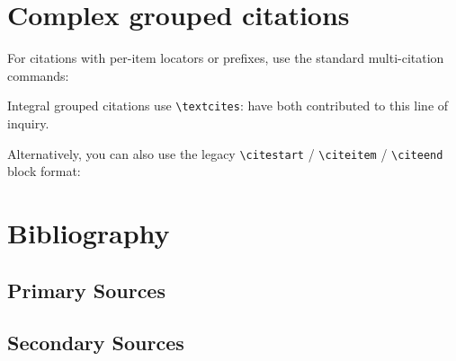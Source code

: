 \documentclass{article}
\begin{document}
\section{Complex grouped citations}

For citations with per-item locators or prefixes, use the standard multi-citation
commands: \cites[see]{chen2017}[also]{okafor2024}

Integral grouped citations use \verb|\textcites|: \textcites{chen2017}{chen2020} have both contributed to this line of inquiry.

Alternatively, you can also use the legacy \verb|\citestart| / \verb|\citeitem| / \verb|\citeend| block format:

\citestart
\citeend

\section{Bibliography}


\subsection*{Primary Sources}
\printcitumbibliography[type=manuscript]

\subsection*{Secondary Sources}
\printcitumbibliography[not-type=manuscript]
\end{document}
